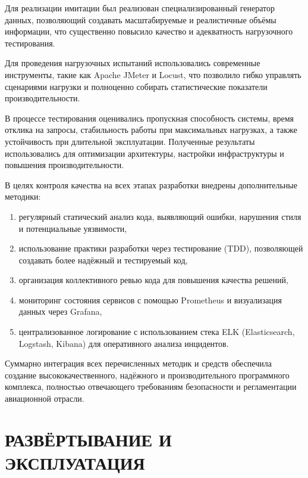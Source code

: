 \documentclass[14pt,a4paper]{extarticle}
\begin{document}
Для реализации имитации был реализован специализированный генератор данных, позволяющий создавать масштабируемые и реалистичные объёмы информации, что существенно повысило качество и адекватность нагрузочного тестирования.

Для проведения нагрузочных испытаний использовались современные инструменты, такие как Apache JMeter и Locust, что позволило гибко управлять сценариями нагрузки и полноценно собирать статистические показатели производительности.

В процессе тестирования оценивались пропускная способность системы, время отклика на запросы, стабильность работы при максимальных нагрузках, а также устойчивость при длительной эксплуатации. Полученные результаты использовались для оптимизации архитектуры, настройки инфраструктуры и повышения производительности.

В целях контроля качества на всех этапах разработки внедрены дополнительные методики:

\begin{enumerate}[label=\alph*)]
\item регулярный статический анализ кода, выявляющий ошибки, нарушения стиля и потенциальные уязвимости,

\item использование практики разработки через тестирование (TDD), позволяющей создавать более надёжный и тестируемый код,

\item организация коллективного ревью кода для повышения качества решений,

\item мониторинг состояния сервисов с помощью Prometheus и визуализация данных через Grafana,

\item централизованное логирование с использованием стека ELK (Elasticsearch, Logstash, Kibana) для оперативного анализа инцидентов.
\end{enumerate}

Суммарно интеграция всех перечисленных методик и средств обеспечила создание высококачественного, надёжного и производительного программного комплекса, полностью отвечающего требованиям безопасности и регламентации авиационной отрасли.


\newpage
\newpage
\section{РАЗВЁРТЫВАНИЕ И ЭКСПЛУАТАЦИЯ}
\end{document}
